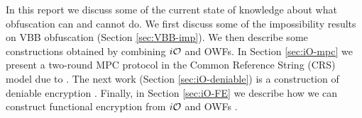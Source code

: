 \documentclass[]{article}
\begin{document}

In this report we discuss some of the current state of knowledge about what obfuscation can and cannot do.
We first discuss some of the impossibility results on VBB obfuscation (Section \ref{sec:VBB-imp}). %
We then describe some constructions obtained by combining $i\mathcal{O}$ and OWFs. In Section \ref{sec:iO-mpc} we present a two-round MPC protocol in the Common Reference String (CRS) model due to \cite{iO-mpc}. The next work (Section \ref{sec:iO-deniable}) is a construction of deniable encryption \cite{iO-deniable}. Finally, in Section \ref{sec:iO-FE} we describe how we can construct functional encryption \cite{} %
from $i\mathcal{O}$ and OWFs \cite{iO-FE}.










{}

\end{document}
